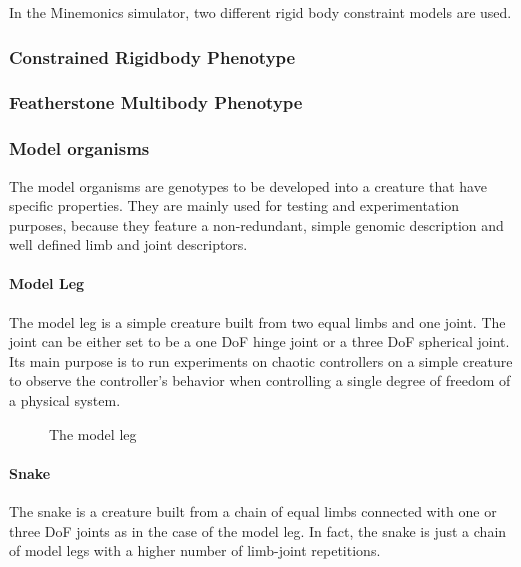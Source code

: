 \documentclass[main]{subfiles}
\begin{document}
In the Minemonics simulator, two different rigid body constraint models are used. 

\subsubsection{Constrained Rigidbody Phenotype}

\lipsum[10]

\subsubsection{Featherstone Multibody Phenotype}

\lipsum[11]

\subsubsection{Model organisms}

The model organisms are genotypes to be developed into a creature that have specific properties. They are mainly used for testing and experimentation purposes, because they feature a non-redundant, simple genomic description and well defined limb and joint descriptors.

\paragraph{Model Leg}

The model leg is a simple creature built from two equal limbs and one joint. The joint can be either set to be a one DoF hinge joint or a three DoF spherical joint. Its main purpose is to run experiments on chaotic controllers on a simple creature to observe the controller's behavior when controlling a single degree of freedom of a physical system.

\begin{figure}[!h]
\centering
{}
\caption{The model leg}
\label{figure:model-leg}
\end{figure}

\paragraph{Snake}

The snake is a creature built from a chain of equal limbs connected with one or three DoF joints as in the case of the model leg. In fact, the snake is just a chain of model legs with a higher number of limb-joint repetitions.
\end{document}
